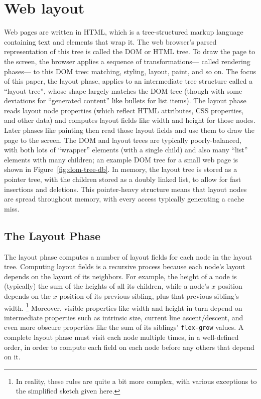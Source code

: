 
\section{Web layout}

Web pages are written in HTML,
  which is a tree-structured markup language
  containing text and elements that wrap it.
The web browser's parsed representation of this tree
  is called the DOM or HTML tree.
To draw the page to the screen,
  the browser applies a sequence of transformations---%
  called rendering phases---%
  to this DOM tree: matching, styling, layout, paint, and so on.
The focus of this paper, the layout phase,
  applies to an intermediate tree structure
  called a ``layout tree'',
  whose shape largely matches the DOM tree
  (though with some deviations for ``generated content''
  like bullets for list items).
The layout phase reads layout node properties
  (which reflect HTML attributes, CSS properties, and other data)
  and computes layout fields like width and height for those nodes.
Later phases like painting then read those layout fields
  and use them to draw the page to the screen.
The DOM and layout trees are typically poorly-balanced,
  with both lots of ``wrapper'' elements (with a single child)
  and also many ``list'' elements with many children;
  an example DOM tree for a small web page
  is shown in Figure~\ref{fig:dom-tree-db}.
In memory,
  the layout tree is stored as a pointer tree,
  with the children stored as a doubly linked list,
  to allow for fast insertions and deletions.
This pointer-heavy structure means
  that layout nodes are spread throughout memory,
  with every access typically generating a cache miss.

\subsection{The Layout Phase}

The layout phase computes a number of layout fields
  for each node in the layout tree.
Computing layout fields is a recursive process
  because each node's layout depends on the layout of its neighbors.
For example, the height of a node is (typically)
  the sum of the heights of all its children,
  while a node's $x$ position depends on the $x$ position
  of its previous sibling, plus that previous sibling's width.%
\footnote{
  In reality, these rules are quite a bit more complex,
    with various exceptions to the simplified sketch given here.
}
Moreover, visible properties like width and height
  in turn depend on intermediate properties such as intrinsic size,
  current line ascent/descent, and even more obscure properties
  like the sum of its siblings' \texttt{flex-grow} values.
A complete layout phase must visit each node multiple times,
  in a well-defined order,
  in order to compute each field on each node
  before any others that depend on it.

